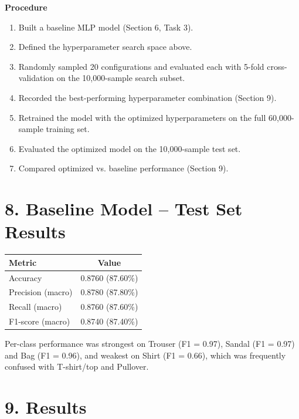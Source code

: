 \documentclass[11pt]{article}
\begin{document}
\textbf{Procedure}

\begin{enumerate}[leftmargin=*]
\item Built a baseline MLP model (Section 6, Task 3).
\item Defined the hyperparameter search space above.
\item Randomly sampled 20 configurations and evaluated each with 5-fold cross-validation on the 10,000-sample search subset.
\item Recorded the best-performing hyperparameter combination (Section 9).
\item Retrained the model with the optimized hyperparameters on the full 60,000-sample training set.
\item Evaluated the optimized model on the 10,000-sample test set.
\item Compared optimized vs. baseline performance (Section 9).
\end{enumerate}


\section*{8. Baseline Model -- Test Set Results}

\begin{center}
\begin{tabular}{|l|c|}
\hline
\textbf{Metric} & \textbf{Value}\\
\hline
Accuracy  & 0.8760 (87.60\%)\\
Precision (macro) & 0.8780 (87.80\%)\\
Recall (macro)    & 0.8760 (87.60\%)\\
F1-score (macro)  & 0.8740 (87.40\%)\\
\hline
\end{tabular}
\end{center}

Per-class performance was strongest on Trouser (F1 = 0.97), Sandal (F1 = 0.97) and Bag (F1 = 0.96), and weakest on Shirt (F1 = 0.66), which was frequently confused with T-shirt/top and Pullover.


\section*{9. Results}
\end{document}
